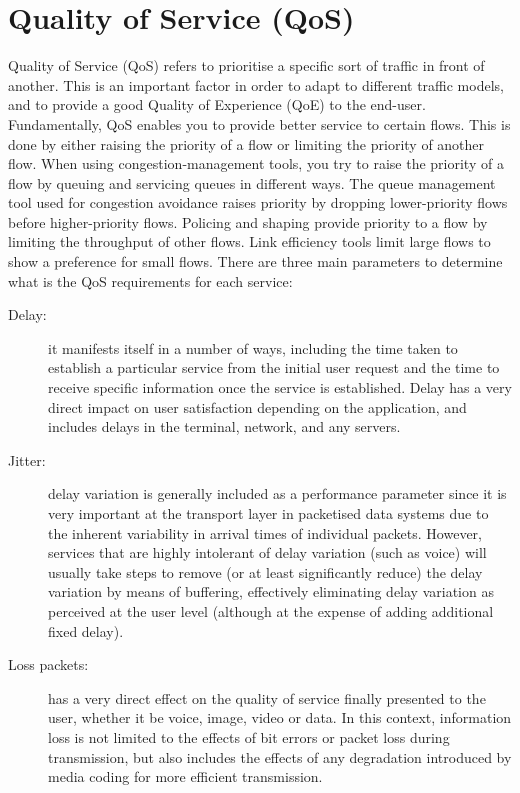 
\section{Quality of Service (QoS)}
\label{sec:qos}

Quality of Service (QoS) refers to prioritise a specific sort of traffic in front of another. This is an important factor in order to adapt to different traffic models, and to provide a good Quality of Experience (QoE) to the end-user.\\

Fundamentally, QoS enables you to provide better service to certain flows. This is done by either raising the priority of a flow or limiting the priority of another flow. When using congestion-management tools, you try to raise the priority of a flow by queuing and servicing queues in different ways. The queue management tool used for congestion avoidance raises priority by dropping lower-priority flows before higher-priority flows. Policing and shaping provide priority to a flow by limiting the throughput of other flows. Link efficiency tools limit large flows to show a preference for small flows. There are three main parameters to determine what is the QoS requirements for each service:\\

\begin{description}
\item[Delay:] it manifests itself in a number of ways, including the time taken to establish a particular service from the initial user request and the time to receive specific information once the service is established. Delay has a very direct impact on user satisfaction depending on the application, and includes delays in the terminal, network, and any servers. 
\item[Jitter:] delay variation is generally included as a performance parameter since it is very important at the transport layer in packetised data systems due to the inherent variability in arrival times of individual packets. However, services that are highly intolerant of delay variation (such as voice) will usually take steps to remove (or at least significantly reduce) the delay variation by means of buffering, effectively eliminating delay variation as perceived at the user level (although at the expense of adding additional fixed delay). 
\item[Loss packets:] has a very direct effect on the quality of service finally presented to the user, whether it be voice, image, video or data. In this context, information loss is not limited to the effects of bit errors or packet loss during transmission, but also includes the effects of any degradation introduced by media coding for more efficient transmission.\\
\end{description} 
   

